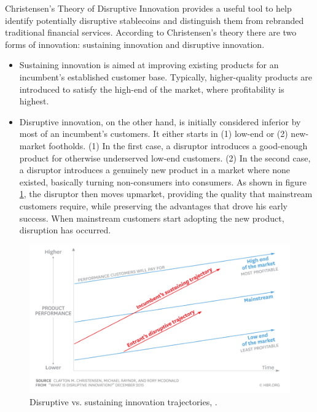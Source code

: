 \documentclass[conference]{IEEEtran}
\begin{document}
Christensen's Theory of Disruptive Innovation provides a useful tool to help identify potentially disruptive stablecoins and distinguish them from rebranded traditional financial services. According to Christensen's theory there are two forms of innovation: sustaining innovation and disruptive innovation.\cite{Christensen}\\

\begin{itemize}
	\item Sustaining innovation is aimed at improving existing products for an incumbent's established customer base. Typically, higher-quality products are introduced to satisfy the high-end of the market, where profitability is highest.
	\item Disruptive innovation, on the other hand, is initially considered inferior by most of an incumbent’s customers. It either starts in (1) low-end or (2) new-market footholds. (1) In the first case, a disruptor introduces a good-enough product for otherwise underserved low-end customers. (2) In the second case, a disruptor introduces a genuinely new product in a market where none existed, basically turning non-consumers into consumers. As shown in figure \ref{fig:disruption}, the disruptor then moves upmarket, providing the quality that mainstream customers require, while preserving the advantages that drove his early success. When mainstream customers start adopting the new product, disruption has occurred.
\end{itemize}

\begin{figure}[htbp]
	\centerline{
		\includegraphics[width=\linewidth]{assets/disruptiveInnovation.png}
		}
	\caption{Disruptive vs. sustaining innovation trajectories, \cite{Christensen}.}
	\label{fig:disruption}
\end{figure}
\end{document}
